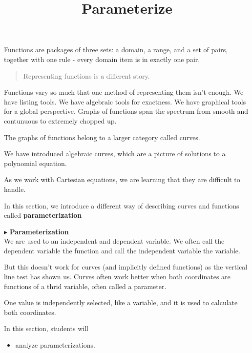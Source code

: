 \documentclass{ximera}
\title{Parameterize}
\begin{document}
\begin{abstract}
\end{abstract}
\maketitle





Functions are packages of three sets: a domain, a range, and a set of pairs, together with one rule - every domain item is in exactly one pair.

\begin{quote}
Representing functions is a different story.
\end{quote}



Functions vary so much that one method of representing them isn't enough.  We have listing tools.  We have algebraic tools for exactness.  We have graphical tools for a global perspective. Graphs of functions span the spectrum from smooth and contunuous to extremely chopped up.

The graphs of functions belong to a larger category called curves.

We have introduced algebraic curves, which are a picture of solutions to a polynomial equation.

As we work with Cartesian equations, we are learning that they are difficult to handle.

In this section, we introduce a different way of describing curves and functions called \textbf{parameterization}



$\blacktriangleright$ \textbf{Parameterization} \\


We are used to an independent and dependent variable.  We often call the dependent variable the function and call the independent variable the variable.

But this doesn't work for curves (and implicitly defined functions) as the vertical line test has shown us.  Curves often work better when both coordinates are functions of a thrid variable, often called a parameter.

One value is independently selected, like a variable, and it is used to calculate both coordinates.

























\begin{sectionOutcomes}
In this section, students will 

\begin{itemize}
\item analyze parameterizations.
\end{itemize}
\end{sectionOutcomes}
\end{document}
